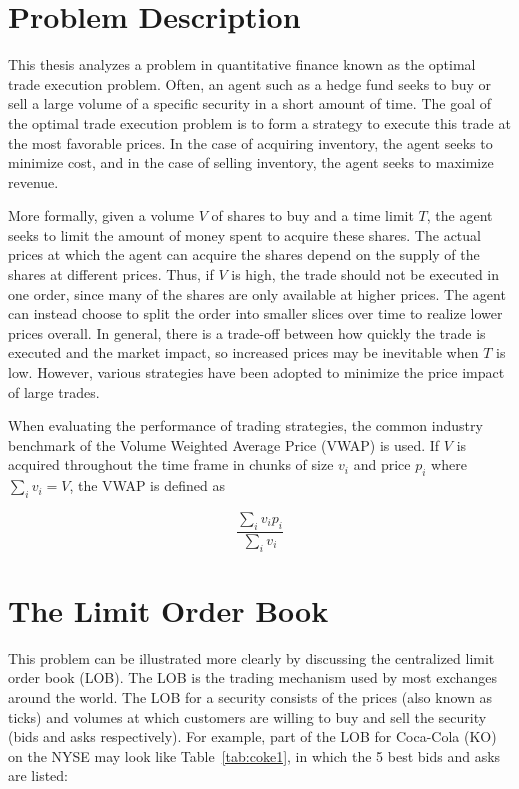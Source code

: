 \section{Problem Description} \label{ch:problemdescription}

This thesis analyzes a problem in quantitative finance known as the optimal trade execution problem. Often, an agent such as a hedge fund seeks to buy or sell a large volume of a specific security in a short amount of time. The goal of the optimal trade execution problem is to form a strategy to execute this trade at the most favorable prices. In the case of acquiring inventory, the agent seeks to minimize cost, and in the case of selling inventory, the agent seeks to maximize revenue.

More formally, given a volume $V$ of shares to buy and a time limit $T$, the agent seeks to limit the amount of money spent to acquire these shares. The actual prices at which the agent can acquire the shares depend on the supply of the shares at different prices. Thus, if $V$ is high, the trade should not be executed in one order, since many of the shares are only available at higher prices. The agent can instead choose to split the order into smaller slices over time to realize lower prices overall. In general, there is a trade-off between how quickly the trade is executed and the market impact, so increased prices may be inevitable when $T$ is low. However, various strategies have been adopted to minimize the price impact of large trades.

When evaluating the performance of trading strategies, the common industry benchmark of the Volume Weighted Average Price (VWAP) is used. If $V$ is acquired throughout the time frame in chunks of size $v_i$ and price $p_i$ where $\sum\limits_i{v_i} = V$, the VWAP is defined as 

$$ \frac{\sum\limits_i{v_i p_i}}{\sum\limits_i{v_i}}$$

\section{The Limit Order Book} \label{ch:background}
This problem can be illustrated more clearly by discussing the centralized limit order book (LOB). The LOB is the trading mechanism used by most exchanges around the world. The LOB for a security consists of the prices (also known as ticks) and volumes at which customers are willing to buy and sell the security (bids and asks respectively). For example, part of the LOB for Coca-Cola (KO) on the NYSE may look like Table~\ref{tab:coke1}, in which the 5 best bids and asks are listed:

